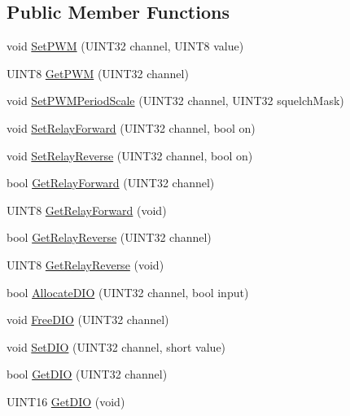 \subsection*{\-Public \-Member \-Functions}
\begin{DoxyCompactItemize}
\item 
void \hyperlink{classDigitalModule_abc8303e66903fec0e24714f307cbb68c}{\-Set\-P\-W\-M} (\-U\-I\-N\-T32 channel, \-U\-I\-N\-T8 value)
\item 
\-U\-I\-N\-T8 \hyperlink{classDigitalModule_a5478b09023e19893ac3829c653221089}{\-Get\-P\-W\-M} (\-U\-I\-N\-T32 channel)
\item 
void \hyperlink{classDigitalModule_aaf1ce0fcdc44fa5b542a34c3c0f308c0}{\-Set\-P\-W\-M\-Period\-Scale} (\-U\-I\-N\-T32 channel, \-U\-I\-N\-T32 squelch\-Mask)
\item 
void \hyperlink{classDigitalModule_aef58ca9a278fae8525da6324ec0f0b1a}{\-Set\-Relay\-Forward} (\-U\-I\-N\-T32 channel, bool on)
\item 
void \hyperlink{classDigitalModule_a6ce11154d9a4480ff1f017c9d8f0b9a5}{\-Set\-Relay\-Reverse} (\-U\-I\-N\-T32 channel, bool on)
\item 
bool \hyperlink{classDigitalModule_a521a7406eac1b38544f1eae056dd94bd}{\-Get\-Relay\-Forward} (\-U\-I\-N\-T32 channel)
\item 
\-U\-I\-N\-T8 \hyperlink{classDigitalModule_a07bc18b3c640ef225098f7e8bc3326d1}{\-Get\-Relay\-Forward} (void)
\item 
bool \hyperlink{classDigitalModule_a4f95a8b6be89d69091cc5d536ed22384}{\-Get\-Relay\-Reverse} (\-U\-I\-N\-T32 channel)
\item 
\-U\-I\-N\-T8 \hyperlink{classDigitalModule_ab30dc33f4f7872588cb001cb91eb65c3}{\-Get\-Relay\-Reverse} (void)
\item 
bool \hyperlink{classDigitalModule_a55769aca83a090e7869764829248561a}{\-Allocate\-D\-I\-O} (\-U\-I\-N\-T32 channel, bool input)
\item 
void \hyperlink{classDigitalModule_a86f94ef21bf5a5b6dbdf66a18f8b8328}{\-Free\-D\-I\-O} (\-U\-I\-N\-T32 channel)
\item 
void \hyperlink{classDigitalModule_abd4f1500090e6e48cbbf8ad244d29fcd}{\-Set\-D\-I\-O} (\-U\-I\-N\-T32 channel, short value)
\item 
bool \hyperlink{classDigitalModule_aff95a87a6af8d7d1e76bb51c2de9fc35}{\-Get\-D\-I\-O} (\-U\-I\-N\-T32 channel)
\item 
\-U\-I\-N\-T16 \hyperlink{classDigitalModule_ae45042ea2f66527493bd8c5a39410612}{\-Get\-D\-I\-O} (void)

\end{DoxyCompactItemize}
